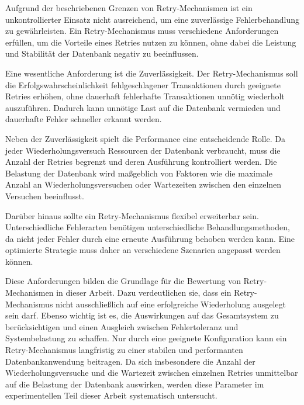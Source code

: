 
Aufgrund der beschriebenen Grenzen von Retry-Mechanismen ist ein unkontrollierter Einsatz nicht ausreichend, um eine
zuverlässige Fehlerbehandlung zu gewährleisten.
Ein Retry-Mechanismus muss verschiedene Anforderungen erfüllen, um die Vorteile eines Retries nutzen zu können, ohne
dabei die Leistung und Stabilität der Datenbank negativ zu beeinflussen.

Eine wesentliche Anforderung ist die Zuverlässigkeit.
Der Retry-Mechanismus soll die Erfolgswahrscheinlichkeit fehlgeschlagener Transaktionen durch geeignete Retries
erhöhen, ohne dauerhaft fehlerhafte Transaktionen unnötig wiederholt auszuführen.
Dadurch kann unnötige Last auf die Datenbank vermieden und dauerhafte Fehler schneller erkannt werden.

Neben der Zuverlässigkeit spielt die Performance eine entscheidende Rolle.
Da jeder Wiederholungsversuch Ressourcen der Datenbank verbraucht, muss die Anzahl der Retries begrenzt und deren
Ausführung kontrolliert werden.
Die Belastung der Datenbank wird maßgeblich von Faktoren wie die maximale Anzahl an Wiederholungsversuchen oder
Wartezeiten zwischen den einzelnen Versuchen beeinflusst.

Darüber hinaus sollte ein Retry-Mechanismus flexibel erweiterbar sein.
Unterschiedliche Fehlerarten benötigen unterschiedliche Behandlungsmethoden, da nicht jeder Fehler durch eine erneute
Ausführung behoben werden kann.
Eine optimierte Strategie muss daher an verschiedene Szenarien angepasst werden können.

Diese Anforderungen bilden die Grundlage für die Bewertung von Retry-Mechanismen in dieser Arbeit.
Dazu verdeutlichen sie, dass ein Retry-Mechanismus nicht ausschließlich auf eine erfolgreiche Wiederholung ausgelegt
sein darf.
Ebenso wichtig ist es, die Auswirkungen auf das Gesamtsystem zu berücksichtigen und einen Ausgleich zwischen
Fehlertoleranz und Systembelastung zu schaffen.
Nur durch eine geeignete Konfiguration kann ein Retry-Mechanismus langfristig zu einer stabilen und performanten
Datenbankanwendung beitragen.
Da sich insbesondere die Anzahl der Wiederholungsversuche und die Wartezeit zwischen einzelnen Retries unmittelbar
auf die Belastung der Datenbank auswirken, werden diese Parameter im experimentellen Teil dieser Arbeit
systematisch untersucht.